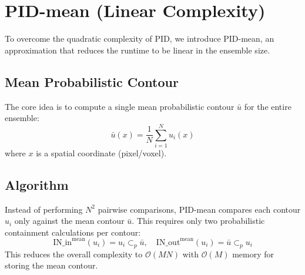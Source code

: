 \documentclass[review,journal]{vgtc}              %
\begin{document}
\section{PID-mean (Linear Complexity)}
\label{sec:pidmean}
To overcome the quadratic complexity of PID, we introduce PID-mean, an approximation that reduces the runtime to be linear in the ensemble size.

\subsection{Mean Probabilistic Contour}
The core idea is to compute a single mean probabilistic contour $\bar{u}$ for the entire ensemble:
\begin{equation}
\bar u(x)=\frac1N\sum_{i=1}^{N}u_i(x)
\end{equation}
where $x$ is a spatial coordinate (pixel/voxel).

\subsection{Algorithm}
Instead of performing $N^2$ pairwise comparisons, PID-mean compares each contour $u_i$ only against the mean contour $\bar{u}$. This requires only two probabilistic containment calculations per contour:
\begin{equation}
\mathrm{IN\_in}^{\text{mean}}(u_i)=u_i\subset_{\!p}\bar u,\quad \mathrm{IN\_out}^{\text{mean}}(u_i)=\bar u\subset_{\!p}u_i
\end{equation}
This reduces the overall complexity to $\mathcal{O}(MN)$ with $\mathcal{O}(M)$ memory for storing the mean contour.
\end{document}
